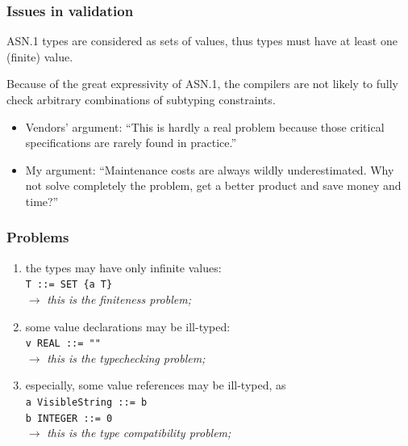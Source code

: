 \documentclass[compress,dvips,xcolor={dvipsnames},t]{beamer}
\newcommand\ASN{\textsf{ASN.1}\xspace}
\newcounter{savedenum}
\newcommand*{\saveenum}{\setcounter{savedenum}{\theenumi}}
\begin{document}
\begin{frame}
\frametitle{Issues in validation}

\ASN types are considered as sets of values, thus types must have at
least one (finite) value.

\bigskip

Because of the great expressivity of \ASN, the compilers are not
likely to fully check arbitrary combinations of subtyping
constraints.

\bigskip

\begin{itemize}

\item Vendors' argument: ``This is hardly a real problem because those
  critical specifications are rarely found in practice.''

\bigskip

\item My argument: ``Maintenance costs are always wildly
  underestimated. Why not solve completely the problem, get a better
  product and save money and time?''

\end{itemize}

\end{frame}


\begin{frame}
\frametitle{Problems}

\begin{enumerate}

  \item \label{finiteness} the types may have only infinite
        values:\\
        \texttt{T ::= SET \{a T\}}\\
        \(\rightarrow\) \emph{this is the finiteness problem;}

  \item \label{type_conformance} some value declarations may be
        ill-typed:\\
        \texttt{v REAL ::= ""}\\
        \(\rightarrow\) \emph{this is the typechecking problem;}

  \item \label{type_compatibility} especially, some value references
        may be ill-typed, as\\
        \texttt{a VisibleString ::= b}\\
        \texttt{b INTEGER ::= 0}\\
        \(\rightarrow\) \emph{this is the type compatibility problem;}

\saveenum

\end{enumerate}

\end{frame}
\end{document}
